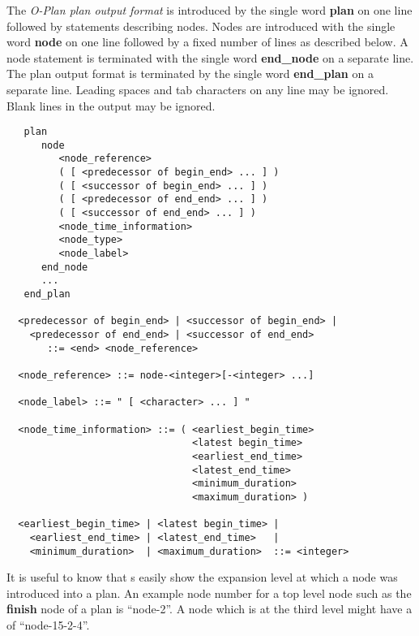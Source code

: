 
The {\em O-Plan plan output format} is introduced by the single word {\bf
plan} on one line followed by statements describing nodes.  Nodes are
introduced with the single word {\bf node} on one line followed by a fixed
number of lines as described below.  A node statement is terminated with the
single word {\bf end\_node} on a separate line.  The plan output format is
terminated by the single word {\bf end\_plan} on a separate line.  Leading
spaces and tab characters on any line may be ignored.  Blank lines in the
output may be ignored.

\begin{verbatim}
   plan
      node
         <node_reference>
         ( [ <predecessor of begin_end> ... ] )
         ( [ <successor of begin_end> ... ] )
         ( [ <predecessor of end_end> ... ] )
         ( [ <successor of end_end> ... ] )
         <node_time_information>
         <node_type>
         <node_label>
      end_node
      ...
   end_plan

  <predecessor of begin_end> | <successor of begin_end> |
    <predecessor of end_end> | <successor of end_end>
       ::= <end> <node_reference>

  <node_reference> ::= node-<integer>[-<integer> ...]

  <node_label> ::= " [ <character> ... ] "

  <node_time_information> ::= ( <earliest_begin_time>
                                <latest begin_time>
                                <earliest_end_time>
                                <latest_end_time>
                                <minimum_duration>
                                <maximum_duration> )

  <earliest_begin_time> | <latest begin_time> | 
    <earliest_end_time> | <latest_end_time>   |
    <minimum_duration>  | <maximum_duration>  ::= <integer>
\end{verbatim}

It is useful to know that s easily show the expansion
level at which a node was introduced into a plan.  An example node number for
a top level node such as the {\bf finish} node of a plan is ``node-2''.  A
node which is at the third level might have a  of
``node-15-2-4''.

